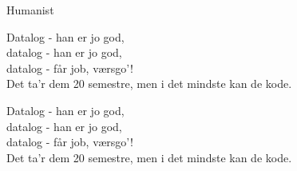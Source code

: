 \begin{song}{Humanist}
  \begin{SBChorus}
    Datalog - han er jo god,\\
    datalog - han er jo god,\\
    datalog - får job, værsgo'!\\
    Det ta'r dem 20 semestre, men i det mindste kan de kode.
  \end{SBChorus}

  \begin{SBChorus}
    Datalog - han er jo god,\\
    datalog - han er jo god,\\
    datalog - får job, værsgo'!\\
    Det ta'r dem 20 semestre, men i det mindste kan de kode.
  \end{SBChorus}

\end{song}